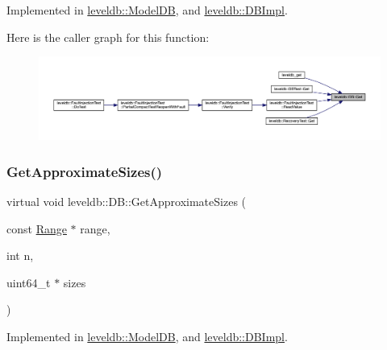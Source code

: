 Implemented in \mbox{\hyperlink{classleveldb_1_1_model_d_b_ab7744a74b5c0d2cd812dd87e83ca561b}{leveldb\+::\+Model\+DB}}, and \mbox{\hyperlink{classleveldb_1_1_d_b_impl_a089964ddcd1f5dc85e73499ae57be508}{leveldb\+::\+D\+B\+Impl}}.

Here is the caller graph for this function\+:
\nopagebreak
\begin{figure}[H]
\begin{center}
\leavevmode
\includegraphics[width=350pt]{classleveldb_1_1_d_b_ad43bd7937b9af88ff856eb8158890911_icgraph}
\end{center}
\end{figure}
\mbox{\label{classleveldb_1_1_d_b_ad4d54aa1dbcecc8583b013ab2d67aeff}} 
\subsubsection{\texorpdfstring{GetApproximateSizes()}{GetApproximateSizes()}}
{\footnotesize\ttfamily virtual void leveldb\+::\+D\+B\+::\+Get\+Approximate\+Sizes (\begin{DoxyParamCaption}\item[{const \mbox{\hyperlink{structleveldb_1_1_range}{Range}} $\ast$}]{range,  }\item[{int}]{n,  }\item[{uint64\+\_\+t $\ast$}]{sizes }\end{DoxyParamCaption})\hspace{0.3cm}{\ttfamily [pure virtual]}}



Implemented in \mbox{\hyperlink{classleveldb_1_1_model_d_b_aeb5502077fae602c5ca3c1153f29b693}{leveldb\+::\+Model\+DB}}, and \mbox{\hyperlink{classleveldb_1_1_d_b_impl_af08e218d92064699942c195ce0f06010}{leveldb\+::\+D\+B\+Impl}}.

